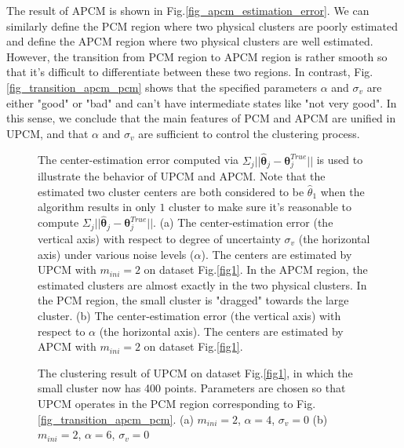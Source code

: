 \documentclass[journal,transmag]{IEEEtran}
\theoremstyle{definition}
\begin{document}
The result of APCM is shown in Fig.\ref{fig_apcm_estimation_error}.
We can similarly define the PCM region where two physical clusters are poorly estimated and define the APCM region where two physical clusters are well estimated.
However, the transition from PCM region to APCM region is rather smooth so that it's difficult to differentiate between these two regions.
In contrast, Fig.\ref{fig_transition_apcm_pcm} shows that the specified parameters $\alpha$ and $\sigma_v$ are either "good" or "bad" and can't have
intermediate states like "not very good". In this sense, we conclude that the main features of PCM and APCM are unified in UPCM, and that $\alpha$ and $\sigma_v$ are sufficient to control the clustering process.
\begin{figure}[!t]
   \centering
\caption{The center-estimation error computed via $\Sigma_j||\hat{\boldsymbol{\theta}}_j-\boldsymbol{\theta}_j^{True}||$ is used to illustrate the behavior of UPCM and APCM. Note that the estimated two cluster centers are both considered to be $\hat{\theta}_1$ when the algorithm results in only $1$ cluster to make sure it's reasonable to compute $\Sigma_j||\hat{\boldsymbol{\theta}}_j-\boldsymbol{\theta}_j^{True}||$. (a) The center-estimation error (the vertical axis) with respect to degree of uncertainty $\sigma_v$ (the horizontal axis) under various noise levels ($\alpha$). The centers are estimated by UPCM with $m_{ini}=2$ on dataset Fig.\ref{fig1}. In the APCM region, the estimated clusters are almost exactly in the two physical clusters. In the PCM region, the small cluster is "dragged" towards the large cluster. (b) The center-estimation error (the vertical axis) with respect to $\alpha$ (the horizontal axis). The centers are estimated by APCM with $m_{ini}=2$ on dataset Fig.\ref{fig1}.}
\label{estimation_error_contrast}
\end{figure}
\begin{figure}[!t]
   \centering
\caption{The clustering result of UPCM on dataset Fig.\ref{fig1}, in which the small cluster now has 400 points. Parameters are chosen so that UPCM operates in the PCM region corresponding to Fig.\ref{fig_transition_apcm_pcm}. (a) $m_{ini}=2$, $\alpha=4$, $\sigma_v=0$ (b) $m_{ini}=2$, $\alpha=6$, $\sigma_v=0$}
\label{fig1_merge_case_upcm}
\end{figure}
\end{document}
